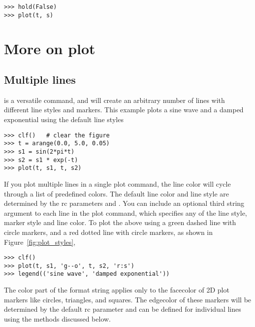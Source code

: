 \documentclass[twoside]{book}
\begin{document}
\begin{lstlisting}
>>> hold(False)
>>> plot(t, s)
\end{lstlisting}

\section{More on plot}
\label{sec:plot}

\subsection{Multiple lines}
\label{sec:plot_multiple_lines}

 is a versatile command, and will create an arbitrary
number of lines with different line styles and markers.  This example
plots a sine wave and a damped exponential using the default line styles

\begin{lstlisting}
>>> clf()   # clear the figure
>>> t = arange(0.0, 5.0, 0.05)
>>> s1 = sin(2*pi*t)
>>> s2 = s1 * exp(-t)
>>> plot(t, s1, t, s2)
\end{lstlisting}

\noindent If you plot multiple lines in a single plot command, the
line color will cycle through a list of predefined colors.  The
default line color and line style are determined by the rc parameters
 and .  You can include an optional
third string argument to each line in the plot command, which
specifies any of the line style, marker style and line color.  To plot
the above using a green dashed line with circle markers, and a red
dotted line with circle markers, as shown in
Figure~\ref{fig:plot_styles}, 

\begin{lstlisting}
>>> clf()   
>>> plot(t, s1, 'g--o', t, s2, 'r:s')
>>> legend(('sine wave', 'damped exponential'))
\end{lstlisting}


\noindent The color part of the format string applies only to the
facecolor of 2D plot markers like circles, triangles, and squares.
The edgecolor of these markers will be determined by the default rc
parameter  and can be defined for individual
lines using the methods discussed below.
\end{document}
